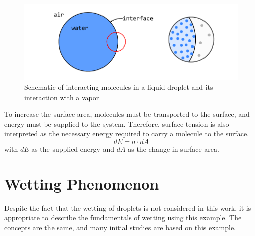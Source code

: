 \begin{figure}[h]
    \centering
    \includegraphics[width=.9\textwidth]{Pictures/moleculesAhesionCohesion_Wetting.pdf}
    \caption{Schematic of interacting molecules in a liquid droplet and its interaction with a vapor}
    \label{fig: WettingTheory_SurfaceTensionMolecules}
\end{figure}
To increase the surface area, molecules must be transported to the surface, and energy must be supplied to the system. Therefore, surface tension is also interpreted as the necessary energy required to carry a molecule to the surface.
\begin{equation}
    dE = \sigma \cdot dA
\end{equation}
with \(dE\) as the supplied energy and \(dA\) as the change in surface area.


\section{Wetting Phenomenon}
Despite the fact that the wetting of droplets is not considered in this work, it is appropriate to describe the fundamentals of wetting using this example. The concepts are the same, and many initial studies are based on this example.

